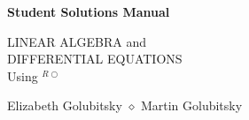 \newcommand{\exer}[1]{\paragraph\noindent\hspace*{-0.186in}\ifodd\value{page}\reversemarginpar\else\normalmarginpar\fi\marginpar{\bf\ref{#1}.}}

\def\tm{{\ooalign{\hfil\raise.15ex\hbox{\tiny R}\hfil\crcr\mathhexbox20D}}}

\newcommand{\trademark}{{R\!\!\!\!\!\bigcirc}}

%
 
 

 




\makeindex


 
\setcounter{page}{0}

\vspace*{1.0in} 

\Huge

\begin{center}

{\bf Student Solutions Manual}

\vspace{1.5in} 

\huge

LINEAR ALGEBRA and \\
DIFFERENTIAL EQUATIONS \\
Using \protect{\Matlabp}$^\trademark$
 
\vspace{2.0in}

 
Elizabeth Golubitsky \quad $\diamond$ \quad Martin Golubitsky
\end{center}
\normalsize


